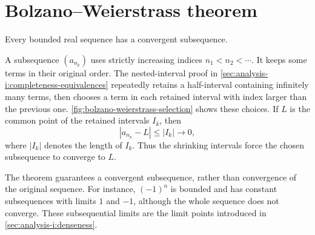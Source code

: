 \section{Bolzano--Weierstrass theorem}
\label{sec:analysis-i:bolzano-weierstrass-theorem}


\begin{theorem}
  \label{thm:analysis-i:bolzano-weierstrass}
  Every bounded real sequence has a convergent subsequence.
\end{theorem}

\begin{marginfigure}[22mm]
  \centering
  
  \caption[Selecting a subsequence in nested intervals.]{Schematic selection in nested intervals. Each $I_k$
    contains infinitely many terms, so we can choose $a_{n_k}\in I_k$
    with $n_1<n_2<\cdots$. The shrinking intervals share the point $L$.
    The construction continues beyond the rows shown.}
  \label{fig:bolzano-weierstrass-selection}
\end{marginfigure}

A subsequence $(a_{n_k})$ uses strictly increasing indices
$n_1<n_2<\cdots$. It keeps some terms in their original order.
The nested-interval proof in
\autoref{sec:analysis-i:completeness-equivalences} repeatedly retains
a half-interval containing infinitely many terms, then chooses a term
in each retained interval with index larger than the previous one.
\autoref{fig:bolzano-weierstrass-selection} shows these choices.
If $L$ is the common point of the retained intervals $I_k$, then
\[
  |a_{n_k}-L|\le |I_k|\longrightarrow0,
\]
where $|I_k|$ denotes the length of $I_k$. Thus the shrinking intervals
force the chosen subsequence to converge to $L$.

The theorem guarantees a convergent subsequence, rather than convergence
of the original sequence. For instance, $(-1)^n$ is bounded and has
constant subsequences with limits $1$ and $-1$, although the whole
sequence does not converge. These subsequential limits are the limit
points introduced in \autoref{sec:analysis-i:denseness}.
